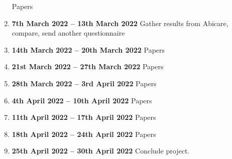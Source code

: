 \documentclass[a4paper]{article}
\begin{document}
\begin{enumerate}[leftmargin=*]
	Papers
	\item \textbf{7th March 2022 -- 13th March 2022}
	Gather results from Abicare, compare, send another questionnaire
	\item \textbf{14th March 2022 -- 20th March 2022}
	Papers
	\item \textbf{21st March 2022 -- 27th March 2022}
	Papers
	\item \textbf{28th March 2022 -- 3rd April 2022}
	Papers
	\item \textbf{4th April 2022 -- 10th April 2022}
	Papers
	\item \textbf{11th April 2022 -- 17th April 2022}
	Papers
	\item \textbf{18th April 2022 -- 24th April 2022}
	Papers
	\item \textbf{25th April 2022 -- 30th April 2022}
	Conclude project.
	
	
\end{enumerate}	
\end{document}
